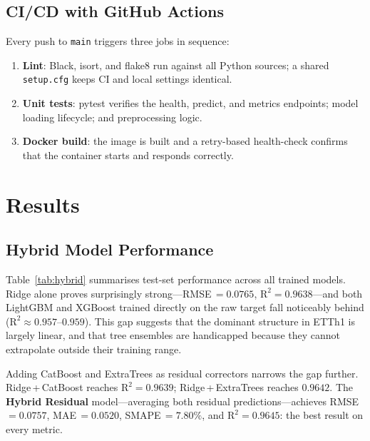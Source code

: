 \documentclass[conference]{IEEEtran}
\begin{document}
  \subsection{CI/CD with GitHub Actions}

  Every push to \texttt{main} triggers three jobs in sequence:
  \begin{enumerate}
    \item \textbf{Lint}: Black, isort, and flake8 run against all Python sources;
      a shared \texttt{setup.cfg} keeps CI and local settings identical.

    \item \textbf{Unit tests}: pytest verifies the health, predict, and metrics
      endpoints; model loading lifecycle; and preprocessing logic.

    \item \textbf{Docker build}: the image is built and a retry-based health-check
      confirms that the container starts and responds correctly.
  \end{enumerate}

  \section{Results}

  \subsection{Hybrid Model Performance}

  Table~\ref{tab:hybrid} summarises test-set performance across all trained models.
  Ridge alone proves surprisingly strong---RMSE\,$=0.0765$, $\text{R}^{2}=0.9638$---and
  both LightGBM and XGBoost trained directly on the raw target fall noticeably behind
  ($\text{R}^{2}\approx 0.957$--$0.959$). This gap suggests that the dominant structure
  in ETTh1 is largely linear, and that tree ensembles are handicapped because they
  cannot extrapolate outside their training range.

  Adding CatBoost and ExtraTrees as residual correctors narrows the gap further.
  Ridge\,+\,CatBoost reaches $\text{R}^{2}=0.9639$; Ridge\,+\,ExtraTrees reaches
  $0.9642$. The \textbf{Hybrid Residual} model---averaging both residual
  predictions---achieves RMSE\,$=0.0757$, MAE\,$=0.0520$, SMAPE\,$=7.80\%$, and
  $\text{R}^{2}=0.9645$: the best result on every metric.
\end{document}
